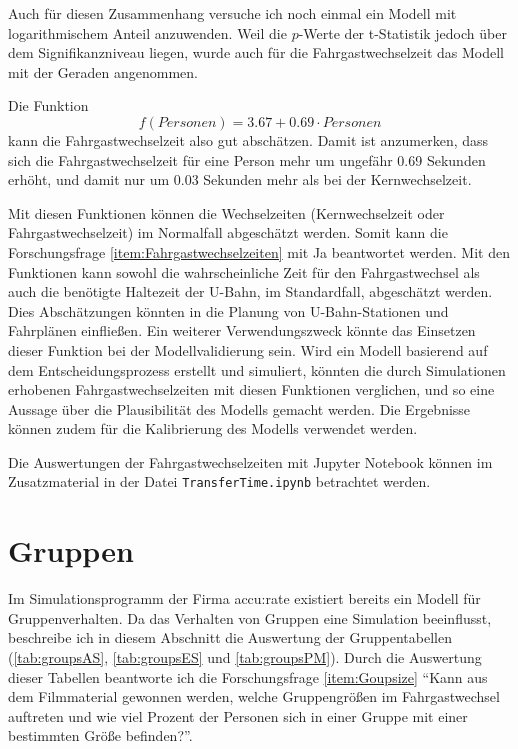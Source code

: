 Auch für diesen Zusammenhang versuche ich noch einmal ein Modell mit logarithmischem Anteil anzuwenden. Weil die $p$-Werte der t-Statistik jedoch über dem Signifikanzniveau liegen, wurde auch für die Fahrgastwechselzeit das Modell mit der Geraden angenommen.

Die Funktion 
\begin{equation}
f(Personen) = 3.67 + 0.69 \cdot Personen 
\end{equation}  
kann die Fahrgastwechselzeit also gut abschätzen. Damit ist anzumerken, dass sich die Fahrgastwechselzeit für eine Person mehr um ungefähr 0.69 Sekunden erhöht, und damit nur um 0.03 Sekunden mehr als bei der Kernwechselzeit.

Mit diesen Funktionen können die Wechselzeiten (Kernwechselzeit oder Fahrgastwechselzeit) im Normalfall abgeschätzt werden. Somit kann die Forschungsfrage \ref{item:Fahrgastwechselzeiten} mit Ja beantwortet werden. Mit den Funktionen kann sowohl die wahrscheinliche Zeit für den Fahrgastwechsel als auch die benötigte Haltezeit der U-Bahn, im Standardfall, abgeschätzt werden. Dies Abschätzungen könnten in die Planung von U-Bahn-Stationen und Fahrplänen einfließen. Ein weiterer Verwendungszweck könnte das Einsetzen dieser Funktion bei der Modellvalidierung sein. Wird ein Modell basierend auf dem Entscheidungsprozess erstellt und simuliert, könnten die durch Simulationen erhobenen Fahrgastwechselzeiten mit diesen Funktionen verglichen, und so eine Aussage über die Plausibilität des Modells gemacht werden. Die Ergebnisse können zudem für die Kalibrierung des Modells verwendet werden. 

Die Auswertungen der Fahrgastwechselzeiten mit \textsf{Jupyter Notebook} können im Zusatzmaterial in der Datei \texttt{TransferTime.ipynb} betrachtet werden.
\section{Gruppen} \label{Gruppen}
Im Simulationsprogramm der Firma accu:rate existiert bereits ein Modell für Gruppenverhalten. Da das Verhalten von Gruppen eine Simulation beeinflusst, beschreibe ich in diesem Abschnitt die Auswertung der Gruppentabellen (\tablename \ref{tab:groupsAS}, \tablename \ref{tab:groupsES} und \tablename \ref{tab:groupsPM}). Durch die Auswertung dieser Tabellen beantworte ich die Forschungsfrage \ref{item:Goupsize} "`Kann aus dem Filmmaterial gewonnen werden, welche Gruppengrößen im Fahrgastwechsel auftreten und wie viel Prozent der Personen sich in einer Gruppe mit einer bestimmten Größe befinden?"'.


